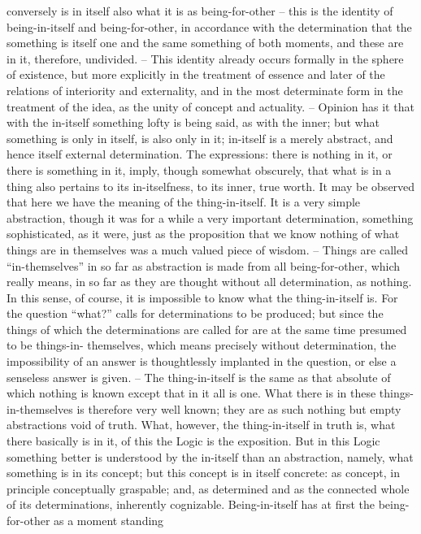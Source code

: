 conversely is in itself also what it is as being-for-other – this is the identity of
being-in-itself and being-for-other, in accordance with the determination
that the something is itself one and the same something of both moments,
and these are in it, therefore, undivided. – This identity already occurs
formally in the sphere of existence, but more explicitly in the treatment of
essence and later of the relations of interiority and externality, and in the
most determinate form in the treatment of the idea, as the unity of concept
and actuality. – Opinion has it that with the in-itself something lofty is
being said, as with the inner; but what something is only in itself, is also only
in it; in-itself is a merely abstract, and hence itself external determination.
The expressions: there is nothing in it, or there is something in it, imply,
though somewhat obscurely, that what is in a thing also pertains to its
in-itselfness, to its inner, true worth.
It may be observed that here we have the meaning of the thing-in-itself.
It is a very simple abstraction, though it was for a while a very important
determination, something sophisticated, as it were, just as the proposition
that we know nothing of what things are in themselves was a much valued
piece of wisdom. – Things are called “in-themselves” in so far as abstraction
is made from all being-for-other, which really means, in so far as they are
thought without all determination, as nothing. In this sense, of course, it
is impossible to know what the thing-in-itself is. For the question “what?”
calls for determinations to be produced; but since the things of which the
determinations are called for are at the same time presumed to be things-in-
themselves, which means precisely without determination, the impossibility
of an answer is thoughtlessly implanted in the question, or else a senseless
answer is given. – The thing-in-itself is the same as that absolute of which
nothing is known except that in it all is one. What there is in these things-
in-themselves is therefore very well known; they are as such nothing but
empty abstractions void of truth. What, however, the thing-in-itself in
truth is, what there basically is in it, of this the Logic is the exposition.
But in this Logic something better is understood by the in-itself than an
abstraction, namely, what something is in its concept; but this concept is
in itself concrete: as concept, in principle conceptually graspable; and, as
determined and as the connected whole of its determinations, inherently
cognizable.
Being-in-itself has at first the being-for-other as a moment standing
